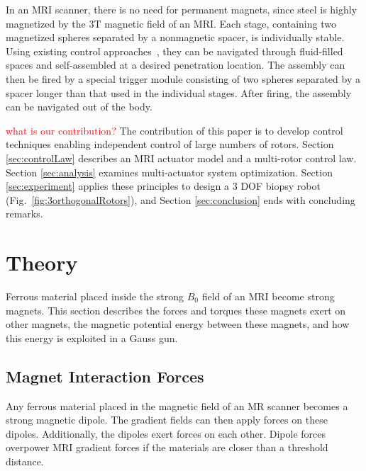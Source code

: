 \documentclass[graybox,usenames]{svmult}
\newcommand{\todo}[1]{\textcolor{red}{\footnotesize \textsf{#1}}}
\begin{document}
 In an MRI scanner, there is no need for permanent magnets, since steel is highly magnetized by the 3T magnetic field of an MRI. Each stage, containing two magnetized spheres separated by a nonmagnetic spacer, is individually stable. Using existing control approaches~\cite{Vartholomeos2012,Eqtami2014}, they can be navigated through fluid-filled spaces and self-assembled at a desired penetration location. The assembly can then be fired by a special trigger module consisting of two spheres separated by a spacer longer than that used in the individual stages. After firing, the assembly can be navigated out of the body.
 
 
 \todo{what is our contribution?}
 The contribution of this paper is to develop control techniques enabling independent control of large numbers of rotors. Section \ref{sec:controlLaw} describes an MRI actuator model and a multi-rotor control law.  Section \ref{sec:analysis} examines multi-actuator system optimization.   Section \ref{sec:experiment} applies these principles to design a 3 DOF biopsy robot (Fig.~\ref{fig:3orthogonalRotors}), and  Section \ref{sec:conclusion} ends with concluding remarks.



\section{Theory}\label{sec:theory}

Ferrous material placed inside the strong $B_0$ field of an MRI become strong magnets.  This section describes the forces and torques these magnets exert on other magnets, the magnetic potential energy between these magnets, and how this energy is exploited in a Gauss gun.

\subsection{Magnet Interaction Forces}\label{subsec:magnetforces}
Any ferrous material placed in the magnetic field of an MR scanner becomes a strong magnetic dipole. The gradient fields can then apply forces on these dipoles.  Additionally, the dipoles exert forces on each other.  Dipole forces overpower MRI gradient forces if the materials are closer than a threshold distance.
\end{document}
